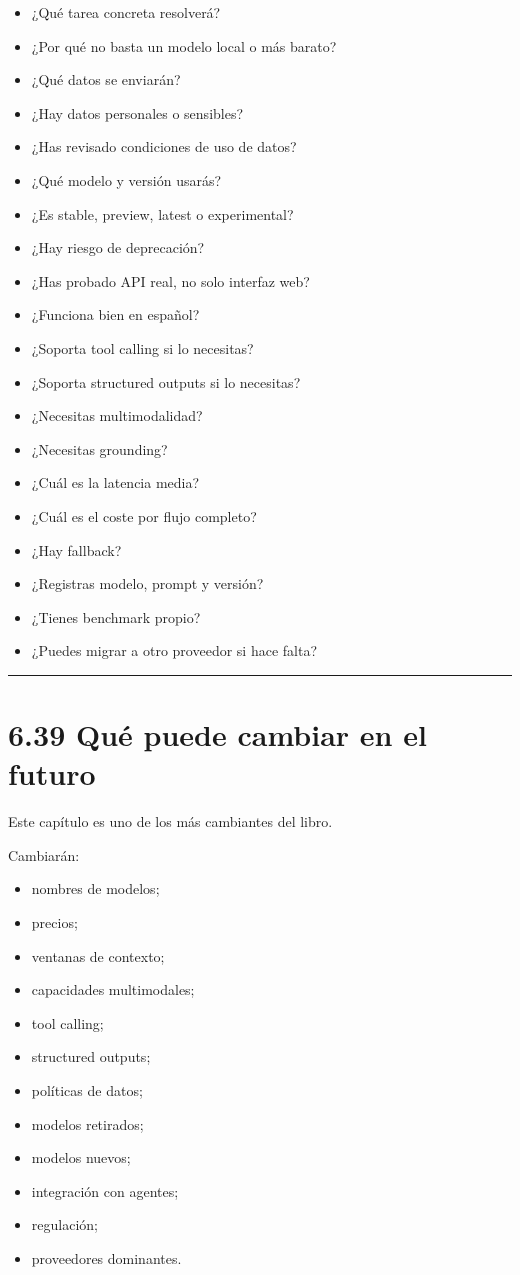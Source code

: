 \begin{itemize}
\tightlist
\item
  ¿Qué tarea concreta resolverá?
\item
  ¿Por qué no basta un modelo local o más barato?
\item
  ¿Qué datos se enviarán?
\item
  ¿Hay datos personales o sensibles?
\item
  ¿Has revisado condiciones de uso de datos?
\item
  ¿Qué modelo y versión usarás?
\item
  ¿Es stable, preview, latest o experimental?
\item
  ¿Hay riesgo de deprecación?
\item
  ¿Has probado API real, no solo interfaz web?
\item
  ¿Funciona bien en español?
\item
  ¿Soporta tool calling si lo necesitas?
\item
  ¿Soporta structured outputs si lo necesitas?
\item
  ¿Necesitas multimodalidad?
\item
  ¿Necesitas grounding?
\item
  ¿Cuál es la latencia media?
\item
  ¿Cuál es el coste por flujo completo?
\item
  ¿Hay fallback?
\item
  ¿Registras modelo, prompt y versión?
\item
  ¿Tienes benchmark propio?
\item
  ¿Puedes migrar a otro proveedor si hace falta?
\end{itemize}

\begin{center}\rule{0.5\linewidth}{0.5pt}\end{center}

\section{6.39 Qué puede cambiar en el
futuro}\label{quuxe9-puede-cambiar-en-el-futuro-5}

Este capítulo es uno de los más cambiantes del libro.

Cambiarán:

\begin{itemize}
\tightlist
\item
  nombres de modelos;
\item
  precios;
\item
  ventanas de contexto;
\item
  capacidades multimodales;
\item
  tool calling;
\item
  structured outputs;
\item
  políticas de datos;
\item
  modelos retirados;
\item
  modelos nuevos;
\item
  integración con agentes;
\item
  regulación;
\item
  proveedores dominantes.
\end{itemize}

